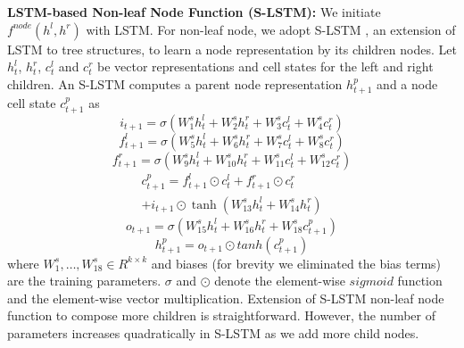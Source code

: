 \documentclass[11pt]{article}
\begin{document}
\textbf{LSTM-based Non-leaf Node Function (S-LSTM):} We initiate $f^{node}(h^l, h^r)$ with LSTM. For non-leaf node, we adopt S-LSTM , an extension of LSTM to tree structures, to learn a node representation by its children nodes. Let $h^l_t$, $h^r_t$, $c^l_t$ and $c^r_t$ be vector representations and cell states for the left and right children. An S-LSTM computes a parent node representation $h^p_{t+1}$ and a node cell state $c^p_{t+1}$ as
\begin{equation}
i_{t+1}=\sigma ( W^{s}_1 h^l_t+W^{s}_2 h^r_t + W^{s}_3 c^l_t + W^{s}_4 c^r_t)
\end{equation}
\begin{equation}
f^l_{t+1}=\sigma ( W^{s}_5 h^l_t+W^{s}_6 h^r_t + W^{s}_7 c^l_t + W^{s}_8 c^r_t)
\end{equation}
\begin{equation}
f^r_{t+1}=\sigma ( W^{s}_9 h^l_t+W^{s}_{10} h^r_t + W^{s}_{11} c^l_t + W^{s}_{12} c^r_t)
\end{equation}
\begin{multline}
c^p_{t+1}= f^l_{t+1} \odot c^l_t + f^r_{t+1} \odot c^r_t \\ + i_{t+1} \odot \tanh(W^{s}_{13} h^l_t + W^{s}_{14} h^r_t)
\end{multline}
\begin{equation}
o_{t+1}=\sigma ( W^{s}_{15} h^l_t+W^{s}_{16} h^r_t + W^{s}_{18} c^p_{t+1})
\end{equation}
\begin{equation}
h^p_{t+1}=o_{t+1} \odot tanh(c^p_{t+1})
\end{equation}
where $W^{s}_1, \ldots, W^{s}_{18} \in R^{k \times k}$ and biases (for brevity we eliminated the bias terms) are the training parameters.  $\sigma$ and $\odot$ denote the element-wise $sigmoid$ function and the element-wise vector multiplication. Extension of S-LSTM non-leaf node function to compose more children is straightforward. However, the number of parameters increases quadratically in S-LSTM as we add more child nodes.
\end{document}

